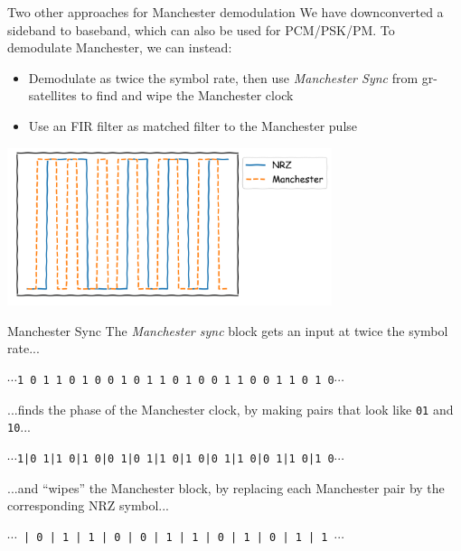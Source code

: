 \documentclass[aspectratio=169]{beamer}
\begin{document}
\begin{frame}{Two other approaches for Manchester demodulation}
  We have downconverted a sideband to baseband, which can also be used for
  PCM/PSK/PM. To demodulate Manchester, we can instead:
  \begin{itemize}
    \item Demodulate as twice the symbol rate, then use \emph{Manchester Sync}
      from gr-satellites to find and wipe the Manchester clock
    \item Use an FIR filter as matched filter to the Manchester pulse
  \end{itemize}

  \begin{center}
    \includegraphics[width=9.5cm]{manchester_wave}
  \end{center}
\end{frame}

\begin{frame}{Manchester Sync}
  The \emph{Manchester sync} block gets an input at twice the symbol rate...
  \begin{center}
    \texttt{$\cdots$1 0 1 1 0 1 0 0 1 0 1 1 0 1 0 0 1 1 0 0 1 1 0 1 0$\cdots$}
  \end{center}
  ...finds the phase of the Manchester clock, by making pairs that look like
  \texttt{01} and \texttt{10}...
  \begin{center}
    \texttt{$\cdots$1|0 1|1 0|1 0|0 1|0 1|1 0|1 0|0 1|1 0|0 1|1 0|1 0$\cdots$}
  \end{center}
  ...and ``wipes'' the Manchester block, by replacing each Manchester pair by
  the corresponding NRZ symbol...
  \begin{center}
    \texttt{$\cdots$ | 0 | 1 | 1 | 0 | 0 | 1 | 1 | 0 | 1 | 0 | 1 | 1 $\cdots$}
  \end{center}
\end{frame}
\end{document}
